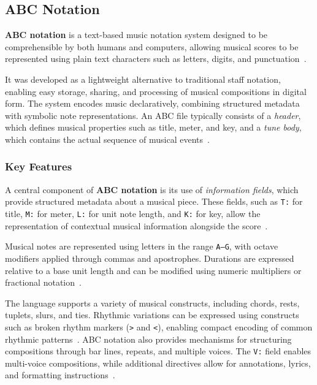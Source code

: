 \subsection{ABC Notation}\label{subsec:abc-notation}

\textbf{ABC notation} is a text-based music notation system designed to be comprehensible by both humans and computers,
allowing musical scores to be represented using plain text characters such as letters, digits, and
punctuation~\cite{Walshaw_2011}.

It was developed as a lightweight alternative to traditional staff notation, enabling easy storage, sharing, and
processing of musical compositions in digital form.
The system encodes music declaratively, combining structured metadata with symbolic note representations.
An ABC file typically consists of a \textit{header}, which defines musical properties such as title, meter,
and key, and a \textit{tune body}, which contains the actual sequence of musical events~\cite{Walshaw_2011}.


\subsubsection{Key Features}

A central component of \textbf{ABC notation} is its use of \textit{information fields}, which provide structured
metadata about a musical piece.
These fields, such as \texttt{T:} for title, \texttt{M:} for meter, \texttt{L:} for unit note length, and \texttt{K:}
for key, allow the representation of contextual musical information alongside the score~\cite{Walshaw_2011}.

Musical notes are represented using letters in the range \texttt{A–G}, with octave modifiers applied through commas and
apostrophes.
Durations are expressed relative to a base unit length and can be modified using numeric multipliers or fractional
notation~\cite{Walshaw_2011}.

The language supports a variety of musical constructs, including chords, rests, tuplets, slurs, and ties.
Rhythmic variations can be expressed using constructs such as broken rhythm markers (\texttt{>} and \texttt{<}),
enabling compact encoding of common rhythmic patterns~\cite{Walshaw_2011}.
ABC notation also provides mechanisms for structuring compositions through bar lines, repeats, and multiple voices.
The \texttt{V:} field enables multi-voice compositions, while additional directives allow for annotations, lyrics, and
formatting instructions~\cite{Walshaw_2011}.

